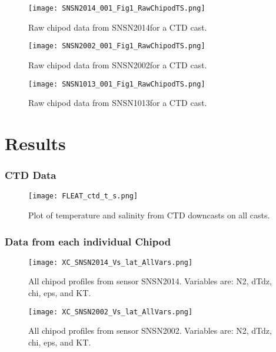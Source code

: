 \documentclass[11pt]{article}
\begin{document}
\begin{figure}[htbp] 
\texttt{[image: SNSN2014\_001\_Fig1\_RawChipodTS.png]} 
\caption{Raw chipod data from SNSN2014for a CTD cast.} 
\label{snSN2014_1} 
\end{figure} 

\begin{figure}[htbp] 
\texttt{[image: SNSN2002\_001\_Fig1\_RawChipodTS.png]} 
\caption{Raw chipod data from SNSN2002for a CTD cast.} 
\label{snSN2002_1} 
\end{figure} 

\begin{figure}[htbp] 
\texttt{[image: SNSN1013\_001\_Fig1\_RawChipodTS.png]} 
\caption{Raw chipod data from SNSN1013for a CTD cast.} 
\label{snSN1013_1} 
\end{figure} 

\newpage 

\section{Results} 

\clearpage 

\subsubsection{CTD Data } 
\begin{figure}[htbp] 
\texttt{[image: FLEAT\_ctd\_t\_s.png]} 
\caption{Plot of temperature and salinity from CTD downcasts on all casts.} 
\label{} 
\end{figure} 

\clearpage 

\subsubsection{Data from each individual Chipod} 

\begin{figure}[htbp] 
\texttt{[image: XC\_SNSN2014\_Vs\_lat\_AllVars.png]} 
\caption{All chipod profiles from sensor SNSN2014. Variables are: N2, dTdz, chi, eps, and KT.} 
\label{} 
\end{figure} 

\begin{figure}[htbp] 
\texttt{[image: XC\_SNSN2002\_Vs\_lat\_AllVars.png]} 
\caption{All chipod profiles from sensor SNSN2002. Variables are: N2, dTdz, chi, eps, and KT.} 
\label{} 
\end{figure} 
\end{document}
